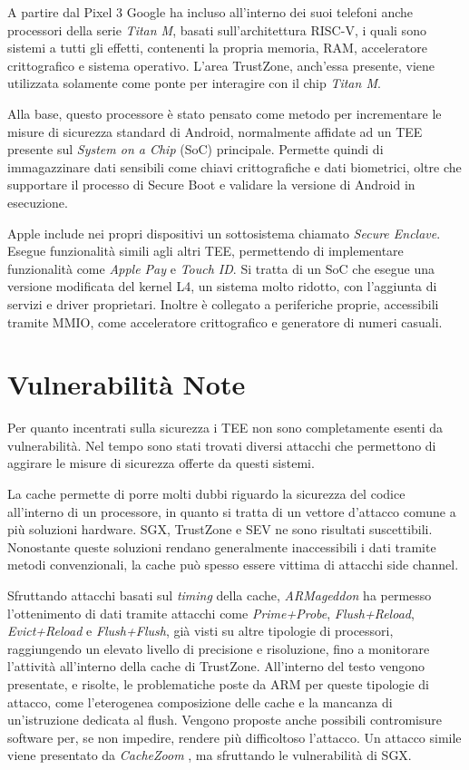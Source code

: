 \documentclass[12pt,italian]{report}
\begin{document}
	\bigbreak
	
	A partire dal Pixel 3 Google ha incluso all'interno dei suoi telefoni anche processori della serie \textit{Titan M}, basati sull'architettura RISC-V, i quali sono sistemi a tutti gli effetti, contenenti la propria memoria, RAM, acceleratore crittografico e sistema operativo. L'area TrustZone, anch'essa presente, viene utilizzata solamente come ponte per interagire con il chip \textit{Titan M}.
	
	Alla base, questo processore è stato pensato come metodo per incrementare le misure di sicurezza standard di Android, normalmente affidate ad un TEE presente sul \textit{System on a Chip} (SoC) principale. Permette quindi di immagazzinare dati sensibili come chiavi crittografiche e dati biometrici, oltre che supportare il processo di Secure Boot e validare la versione di Android in esecuzione.
	
	\bigbreak 
	
	Apple include nei propri dispositivi un sottosistema chiamato \textit{Secure Enclave}. Esegue funzionalità simili agli altri TEE, permettendo di implementare funzionalità come \textit{Apple Pay} e \textit{Touch ID}. Si tratta di un SoC che esegue una versione modificata del kernel L4, un sistema molto ridotto, con l'aggiunta di servizi e driver proprietari. Inoltre è collegato a periferiche proprie, accessibili tramite MMIO, come acceleratore crittografico e generatore di numeri casuali.
	
	\section{Vulnerabilità Note}
	\label{sec:vulnerabilità}
	Per quanto incentrati sulla sicurezza i TEE non sono completamente esenti da vulnerabilità. Nel tempo sono stati trovati diversi attacchi che permettono di aggirare le misure di sicurezza offerte da questi sistemi.
	
	\bigbreak 
	
	La cache permette di porre molti dubbi riguardo la sicurezza del codice all'interno di un processore, in quanto si tratta di un vettore d'attacco comune a più soluzioni hardware. SGX, TrustZone e SEV ne sono risultati suscettibili. Nonostante queste soluzioni rendano generalmente inaccessibili i dati tramite metodi convenzionali, la cache può spesso essere vittima di attacchi side channel.
	
	Sfruttando attacchi basati sul \textit{timing} della cache, \textit{ARMageddon} \cite{armageddon} ha permesso l'ottenimento di dati tramite attacchi come \textit{Prime+Probe}, \textit{Flush+Reload}, \textit{Evict+Reload} e \textit{Flush+Flush}, già visti su altre tipologie di processori, raggiungendo un elevato livello di precisione e risoluzione, fino a monitorare l'attività all'interno della cache di TrustZone. All'interno del testo vengono presentate, e risolte, le problematiche poste da ARM per queste tipologie di attacco, come l'eterogenea composizione delle cache e la mancanza di un'istruzione dedicata al flush. Vengono proposte anche possibili contromisure software per, se non impedire, rendere più difficoltoso l'attacco. Un attacco simile viene presentato da \textit{CacheZoom} \cite{cachezoom}, ma sfruttando le vulnerabilità di SGX.
	
\end{document}
